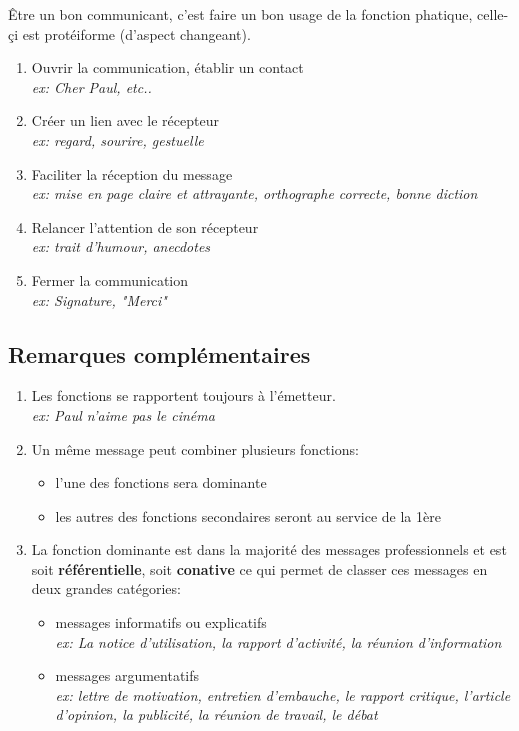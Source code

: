 \documentclass[a4paper,11pt]{report}
\begin{document}
Être un bon communicant, c'est faire un bon usage de la fonction phatique, celle-çi est protéiforme (d'aspect changeant).
\begin{enumerate}
    \item Ouvrir la communication, établir un contact \\
    \textit{ex: Cher Paul, etc..}
    \item Créer un lien avec le récepteur \\
    \textit{ex: regard, sourire, gestuelle}
    \item Faciliter la réception du message \\
    \textit{ex: mise en page claire et attrayante, orthographe correcte, bonne diction}
    \item Relancer l'attention de son récepteur \\
    \textit{ex: trait d'humour, anecdotes}
    \item Fermer la communication \\
    \textit{ex: Signature, "Merci"}
\end{enumerate}


\subsection{Remarques complémentaires}
\begin{enumerate}
    \item Les fonctions se rapportent toujours à l'émetteur. \\
    \textit{ex: Paul n'aime pas le cinéma}
    \item Un même message peut combiner plusieurs fonctions:
    \begin{itemize}
        \item l'une des fonctions sera dominante
        \item les autres des fonctions secondaires seront au service de la 1ère
    \end{itemize}
    \item La fonction dominante est dans la majorité des messages professionnels et est soit \textbf{référentielle}, soit \textbf{conative} ce qui permet de classer ces messages en deux grandes catégories:
    \begin{itemize}
        \item messages informatifs ou explicatifs \\
        \textit{ex: La notice d'utilisation, la rapport d'activité, la réunion d'information}
        \item messages argumentatifs \\
        \textit{ex: lettre de motivation, entretien d'embauche, le rapport critique, l'article d'opinion, la publicité, la réunion de travail, le débat}
    \end{itemize}
\end{enumerate}
\end{document}

